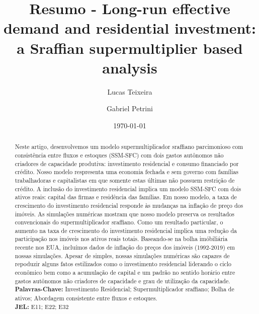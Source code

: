\documentclass[12pt]{article}
\author[1]{Lucas Teixeira}
\affil[1]{Assistent Professor at University of Campinas (Brazil), Email: \url{lucastei@unicamp.br}} %
\author[2]{Gabriel Petrini}
\affil[2]{PhD Student at University of Campinas (Brazil), Email: \url{gpetrinidasilveira@gmail.com}} %
\date{\today}
\title{Resumo - Long-run effective demand and residential investment: a Sraffian supermultiplier based analysis}
\begin{document}
\maketitle
\renewcommand{\abstractname}{Resumo}
\begin{abstract}
Neste artigo, desenvolvemos um modelo supermultiplicador sraffiano parcimonioso com consistência entre fluxos e estoques (SSM-SFC) com dois gastos autônomos não criadores de capacidade produtiva: investimento residencial e consumo financiado por crédito.
Nosso modelo respresenta uma economia fechada e sem governo com famílias trabalhadoras e capitalistas em que somente estas últimas não possuem restrição de crédito.
A inclusão do investimento residencial implica um modelo SSM-SFC com dois ativos reais: capital das firmas e residência das famílias.
Em nosso modelo, a taxa de crescimento do investimento residencial responde às mudanças na inflação de preço dos imóveis.
As simulações numéricas mostram que nosso modelo preserva os resultados convencionais do supermultiplicador sraffiano.
Como um resultado particular, o aumento na taxa de crescimento do investimento residencial implica uma redução da participação nos imóveis nos ativos reais totais.
Baseando-se na bolha imóbiliária recente nos EUA, incluímos dados de inflação do preços dos imóveis (1992-2019) em nossas simulações.
Apesar de simples, nossas simulações numéricas são capazes de repoduzir alguns fatos estilizados como o investimento residencial liderando o ciclo econômico bem como a acumulação de capital e um padrão no sentido horário entre gastos autônomos não criadores de capacidade e grau de utilização da capacidade.\\

\noindent \textbf{Palavras-Chave:} Investimento Residencial; Supermultiplicador sraffiano; Bolha de ativos; Abordagem consistente entre fluxos e estoques.\\
\noindent \textbf{JEL:} E11; E22; E32
\end{abstract}
\end{document}
